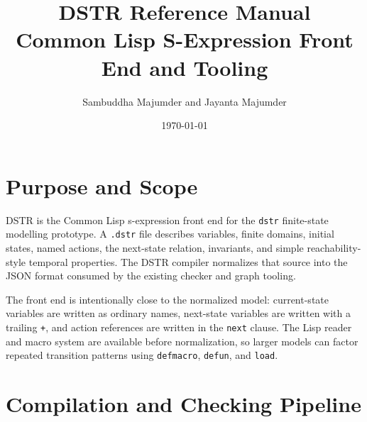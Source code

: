 \documentclass[11pt]{article}
\title{DSTR Reference Manual\\\large Common Lisp S-Expression Front End and Tooling}
\author{Sambuddha Majumder and Jayanta Majumder}
\date{\today}
\begin{document}
\maketitle
\tableofcontents

\section{Purpose and Scope}

DSTR is the Common Lisp s-expression front end for the \texttt{dstr}
finite-state modelling prototype.  A \texttt{.dstr} file describes variables,
finite domains, initial states, named actions, the next-state relation,
invariants, and simple reachability-style temporal properties.  The DSTR
compiler normalizes that source into the JSON format consumed by the existing
checker and graph tooling.

The front end is intentionally close to the normalized model:
current-state variables are written as ordinary names, next-state variables are
written with a trailing \texttt{+}, and action references are written in the
\texttt{next} clause.  The Lisp reader and macro system are available before
normalization, so larger models can factor repeated transition patterns using
\texttt{defmacro}, \texttt{defun}, and \texttt{load}.

\section{Compilation and Checking Pipeline}
\end{document}
